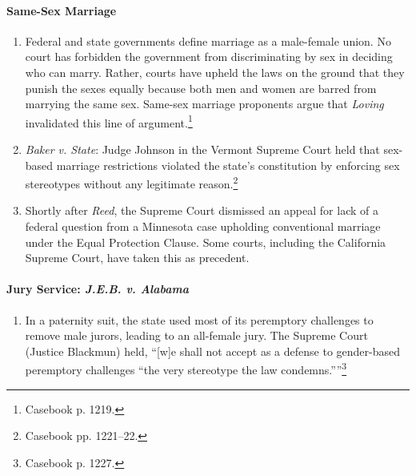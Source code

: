 \paragraph{Same-Sex Marriage}

\begin{enumerate}
    \item Federal and state governments define marriage as a male-female 
    union. No court has forbidden the government from discriminating by sex in 
    deciding who can marry. Rather, courts have upheld the laws on the ground 
    that they punish the sexes equally because both men and women are barred 
    from marrying the same sex. Same-sex marriage proponents argue that 
    \emph{Loving} invalidated this line of argument.\footnote{Casebook p. 
    1219.}
    \item \emph{Baker v. State}: Judge Johnson in the Vermont Supreme Court 
    held that sex-based marriage restrictions violated the state's 
    constitution by enforcing sex stereotypes without any legitimate 
    reason.\footnote{Casebook pp. 1221--22.}
    \item Shortly after \emph{Reed}, the Supreme Court dismissed an appeal for 
    lack of a federal question from a Minnesota case upholding conventional 
    marriage under the Equal Protection Clause. Some courts, including the 
    California Supreme Court, have taken this as precedent.
\end{enumerate}
 
\paragraph{Jury Service: \emph{J.E.B. v. Alabama}}

\begin{enumerate}
    \item In a paternity suit, the state used most of its peremptory 
    challenges to remove male jurors, leading to an all-female jury. The 
    Supreme Court (Justice Blackmun) held, ``[w]e shall not accept as a 
    defense to gender-based peremptory challenges \enquote{the very stereotype the 
    law condemns.}''\footnote{Casebook p. 1227.}
\end{enumerate}

